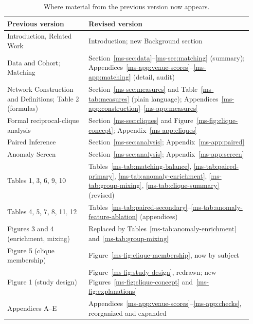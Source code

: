 \documentclass[11pt]{article}
\begin{document}
\begin{table}[t]
  \centering
  \caption{Where material from the previous version now appears.}
  \label{tab:map}
  \small
  \begin{tabularx}{\textwidth}{@{}Y Y@{}}
    \toprule
    Previous version & Revised version \\
    \midrule
    Introduction, Related Work & Introduction; new Background section \\
    Data and Cohort; Matching & Section~\ref{ms-sec:data}--\ref{ms-sec:matching} (summary); Appendices~\ref{ms-app:venue-scores}--\ref{ms-app:matching} (detail, audit) \\
    Network Construction and Definitions; Table 2 (formulas) & Section~\ref{ms-sec:measures} and Table~\ref{ms-tab:measures} (plain language); Appendices~\ref{ms-app:construction}--\ref{ms-app:measures} \\
    Formal reciprocal-clique analysis & Section~\ref{ms-sec:cliques} and Figure~\ref{ms-fig:clique-concept}; Appendix~\ref{ms-app:cliques} \\
    Paired Inference & Section~\ref{ms-sec:analysis}; Appendix~\ref{ms-app:paired} \\
    Anomaly Screen & Section~\ref{ms-sec:analysis}; Appendix~\ref{ms-app:screen} \\
    Tables 1, 3, 6, 9, 10 & Tables~\ref{ms-tab:matching-balance}, \ref{ms-tab:paired-primary}, \ref{ms-tab:anomaly-enrichment}, \ref{ms-tab:group-mixing}, \ref{ms-tab:clique-summary} (revised) \\
    Tables 4, 5, 7, 8, 11, 12 & Tables~\ref{ms-tab:paired-secondary}--\ref{ms-tab:anomaly-feature-ablation} (appendices) \\
    Figures 3 and 4 (enrichment, mixing) & Replaced by Tables~\ref{ms-tab:anomaly-enrichment} and~\ref{ms-tab:group-mixing} \\
    Figure 5 (clique membership) & Figure~\ref{ms-fig:clique-membership}, now by subject \\
    Figure 1 (study design) & Figure~\ref{ms-fig:study-design}, redrawn; new Figures~\ref{ms-fig:clique-concept} and~\ref{ms-fig:explanations} \\
    Appendices A--E & Appendices~\ref{ms-app:venue-scores}--\ref{ms-app:checks}, reorganized and expanded \\
    \bottomrule
  \end{tabularx}
\end{table}
\end{document}
